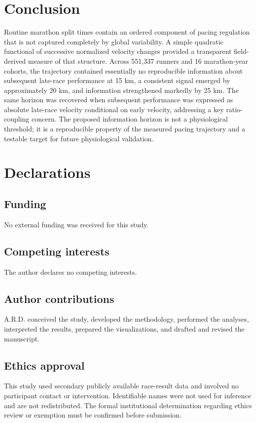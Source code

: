 \documentclass[pdflatex,sn-basic]{sn-jnl}
\begin{document}
\section{Conclusion}
Routine marathon split times contain an ordered component of pacing regulation that is not captured completely by global variability. A simple quadratic functional of successive normalized velocity changes provided a transparent field-derived measure of that structure. Across 551,337 runners and 16 marathon-year cohorts, the trajectory contained essentially no reproducible information about subsequent late-race performance at 15 km, a consistent signal emerged by approximately 20 km, and information strengthened markedly by 25 km. The same horizon was recovered when subsequent performance was expressed as absolute late-race velocity conditional on early velocity, addressing a key ratio-coupling concern. The proposed information horizon is not a physiological threshold; it is a reproducible property of the measured pacing trajectory and a testable target for future physiological validation.


\section*{Declarations}
\subsection*{Funding}
No external funding was received for this study. %
\subsection*{Competing interests}
The author declares no competing interests.
\subsection*{Author contributions}
A.R.D. conceived the study, developed the methodology, performed the analyses, interpreted the results, prepared the visualizations, and drafted and revised the manuscript. %
\subsection*{Ethics approval}
This study used secondary publicly available race-result data and involved no participant contact or intervention. Identifiable names were not used for inference and are not redistributed. The formal institutional determination regarding ethics review or exemption must be confirmed before submission.
\end{document}
